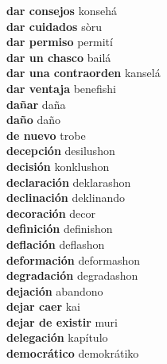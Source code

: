\textbf{ dar consejos  } konsehá \\
\textbf{ dar cuidados  } sòru \\
\textbf{ dar permiso  } permití \\
\textbf{ dar un chasco  } bailá \\
\textbf{ dar una contraorden  } kanselá \\
\textbf{ dar ventaja  } benefishi \\
\textbf{ dañar  } daña \\
\textbf{ daño  } daño \\
\textbf{ de nuevo  } trobe \\
\textbf{ decepción  } desilushon \\
\textbf{ decisión  } konklushon \\
\textbf{ declaración  } deklarashon \\
\textbf{ declinación  } deklinando \\
\textbf{ decoración  } decor \\
\textbf{ definición  } definishon \\
\textbf{ deflación  } deflashon \\
\textbf{ deformación  } deformashon \\
\textbf{ degradación  } degradashon \\
\textbf{ dejación  } abandono \\
\textbf{ dejar caer  } kai \\
\textbf{ dejar de existir  } muri \\
\textbf{ delegación  } kapítulo \\
\textbf{ democrático  } demokrátiko \\
